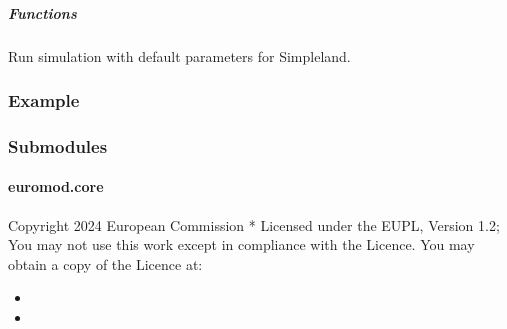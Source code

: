\documentclass[letterpaper,10pt,english]{sphinxmanual}
\begin{document}
\subparagraph{Functions}
\label{\detokenize{autoapi/euromod/test/main/index:functions}}

\begin{fulllineitems}
\label{\detokenize{autoapi/euromod/test/main/index:euromod.test.main.simpleland}}
\pysigstartsignatures
{}
\pysigstopsignatures
\sphinxAtStartPar
Run simulation with default parameters for Simpleland.
\subsubsection*{Example}

\begin{sphinxVerbatim}[commandchars=\\\{\}]
   
\end{sphinxVerbatim}

\end{fulllineitems}



\subsubsection{Submodules}
\label{\detokenize{autoapi/euromod/index:submodules}}
\sphinxstepscope


\paragraph{euromod.core}
\label{\detokenize{autoapi/euromod/core/index:module-euromod.core}}\label{\detokenize{autoapi/euromod/core/index:euromod-core}}\label{\detokenize{autoapi/euromod/core/index::doc}}
\sphinxAtStartPar
Copyright 2024 European Commission
*
Licensed under the EUPL, Version 1.2;
You may not use this work except in compliance with the Licence.
You may obtain a copy of the Licence at:
\begin{itemize}
\item {} 
\sphinxAtStartPar
{}

\item {} 
\end{itemize}
\end{document}
